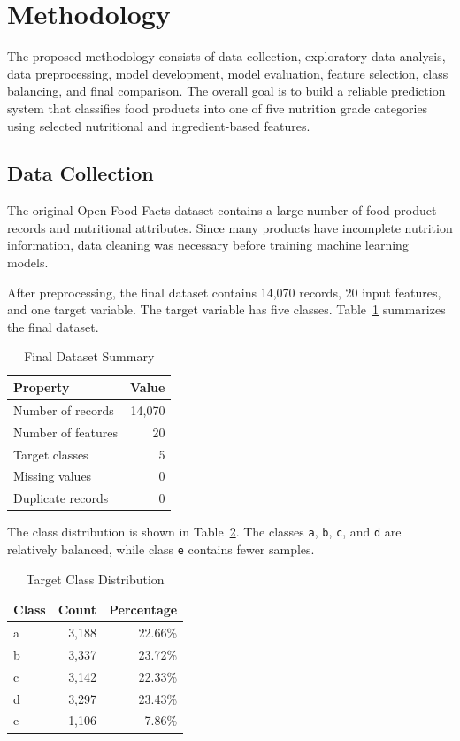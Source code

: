 \documentclass[conference]{IEEEtran}
\begin{document}
\section{Methodology}
The proposed methodology consists of data collection, exploratory data analysis, data preprocessing, model development, model evaluation, feature selection, class balancing, and final comparison. The overall goal is to build a reliable prediction system that classifies food products into one of five nutrition grade categories using selected nutritional and ingredient-based features.

\subsection{Data Collection}
The original Open Food Facts dataset contains a large number of food product records and nutritional attributes. Since many products have incomplete nutrition information, data cleaning was necessary before training machine learning models.

After preprocessing, the final dataset contains 14,070 records, 20 input features, and one target variable. The target variable has five classes. Table~\ref{tab:dataset-summary} summarizes the final dataset.

\begin{table}[htbp]
\caption{Final Dataset Summary}
\begin{center}
\begin{tabular}{lr}
\toprule
\textbf{Property} & \textbf{Value} \\
\midrule
Number of records & 14,070 \\
Number of features & 20 \\
Target classes & 5 \\
Missing values & 0 \\
Duplicate records & 0 \\
\bottomrule
\end{tabular}
\label{tab:dataset-summary}
\end{center}
\end{table}

The class distribution is shown in Table~\ref{tab:class-distribution}. The classes \texttt{a}, \texttt{b}, \texttt{c}, and \texttt{d} are relatively balanced, while class \texttt{e} contains fewer samples.

\begin{table}[htbp]
\caption{Target Class Distribution}
\begin{center}
\begin{tabular}{lrr}
\toprule
\textbf{Class} & \textbf{Count} & \textbf{Percentage} \\
\midrule
a & 3,188 & 22.66\% \\
b & 3,337 & 23.72\% \\
c & 3,142 & 22.33\% \\
d & 3,297 & 23.43\% \\
e & 1,106 & 7.86\% \\
\bottomrule
\end{tabular}
\label{tab:class-distribution}
\end{center}
\end{table}
\end{document}
